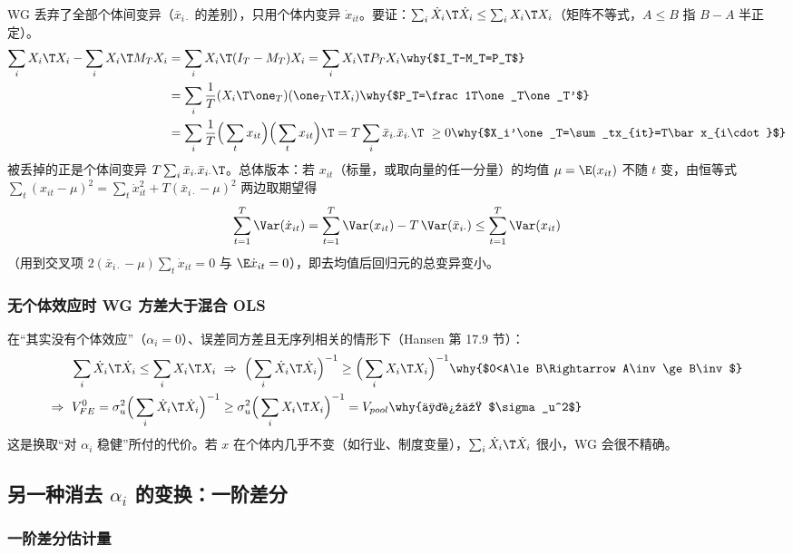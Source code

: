 WG 丢弃了全部个体间变异（$\bar x_{i\cdot}$ 的差别），只用个体内变异 $\dot x_{it}$。要证：$\sum_i\dot X_i\T\dot X_i\le\sum_iX_i\T X_i$（矩阵不等式，$A\le B$ 指 $B-A$ 半正定）。
\begin{align*}
\sum_iX_i\T X_i-\sum_iX_i\T M_TX_i &= \sum_iX_i\T(I_T-M_T)X_i=\sum_iX_i\T P_TX_i \why{$I_T-M_T=P_T$}\\
&= \sum_i\frac1T(X_i\T\one_T)(\one_T\T X_i) \why{$P_T=\frac1T\one_T\one_T'$}\\
&= \sum_i\frac1T\Big(\sum_tx_{it}\Big)\Big(\sum_tx_{it}\Big)\T=T\sum_i\bar x_{i\cdot}\bar x_{i\cdot}\T\ \ge 0 \why{$X_i'\one_T=\sum_tx_{it}=T\bar x_{i\cdot}$}
\end{align*}
被丢掉的正是个体间变异 $T\sum_i\bar x_{i\cdot}\bar x_{i\cdot}\T$。总体版本：若 $x_{it}$（标量，或取向量的任一分量）的均值 $\mu=\E(x_{it})$ 不随 $t$ 变，由恒等式 $\sum_t(x_{it}-\mu)^2=\sum_t\dot x_{it}^2+T(\bar x_{i\cdot}-\mu)^2$ 两边取期望得
\[
\sum_{t=1}^T\Var(\dot x_{it})=\sum_{t=1}^T\Var(x_{it})-T\,\Var(\bar x_{i\cdot})\le\sum_{t=1}^T\Var(x_{it})
\]
（用到交叉项 $2(\bar x_{i\cdot}-\mu)\sum_t\dot x_{it}=0$ 与 $\E\dot x_{it}=0$），即去均值后回归元的总变异变小。

\subsubsection{无个体效应时 WG 方差大于混合 OLS}

在“其实没有个体效应”（$\alpha_i=0$）、误差同方差且无序列相关的情形下（Hansen 第 17.9 节）：
\begin{align*}
\sum_i\dot X_i\T\dot X_i\le\sum_iX_i\T X_i\ &\Rightarrow\ \Big(\sum_i\dot X_i\T\dot X_i\Big)^{-1}\ge\Big(\sum_iX_i\T X_i\Big)^{-1} \why{$0<A\le B\Rightarrow A\inv\ge B\inv$}\\
\Rightarrow\ V^0_{FE}=\sigma_u^2\Big(\sum_i\dot X_i\T\dot X_i\Big)^{-1} &\ge \sigma_u^2\Big(\sum_iX_i\T X_i\Big)^{-1}=V_{pool} \why{两边乘 $\sigma_u^2$}
\end{align*}
这是换取“对 $\alpha_i$ 稳健”所付的代价。若 $x$ 在个体内几乎不变（如行业、制度变量），$\sum_i\dot X_i\T\dot X_i$ 很小，WG 会很不精确。

\subsection{另一种消去 \texorpdfstring{$\alpha_i$}{alpha\_i} 的变换：一阶差分}

\subsubsection{一阶差分估计量}

